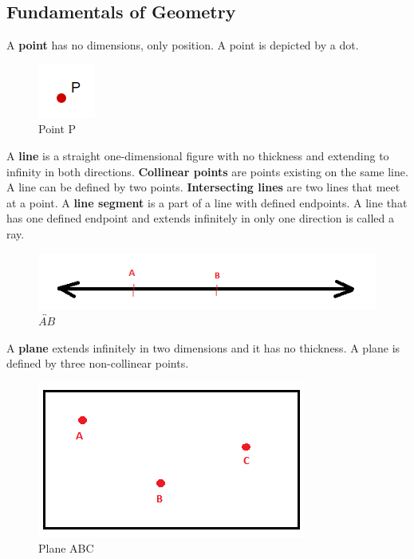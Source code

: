 \documentclass{article}
\begin{document}
        \subsection{Fundamentals of Geometry}
            A \textbf{point} has no dimensions, only position. A point is depicted by a dot. \\

            \begin{figure} [hbt!]
                \centering
                \includegraphics[scale = 0.5] {Resources/Unit1Basics/point.PNG}
                \caption*{Point P}
            \end{figure}

            \noindent A \textbf{line} is a straight one-dimensional figure with no thickness and
            extending to infinity in both directions. \textbf{Collinear points} are points existing
            on the same line. A line can be defined by two points. \textbf{Intersecting lines} are
            two lines that meet at a point. A \textbf{line segment} is a part of a line with defined
            endpoints. A line that has one defined endpoint and extends infinitely in only one
            direction is called a ray. \\

            \begin{figure} [hbt!]
                \centering
                \includegraphics[scale = 0.5] {Resources/Unit1Basics/line.PNG}
                \caption*{$\overleftrightarrow{AB}$}
            \end{figure}

            \noindent A \textbf{plane} extends infinitely in two dimensions and it has no thickness.
            A plane is defined by three non-collinear points. \\

            \begin{figure} [hbt!]
                \centering
                \includegraphics[scale = 0.3] {Resources/Unit1Basics/plane.PNG}
                \caption*{Plane ABC}
            \end{figure}
\end{document}
